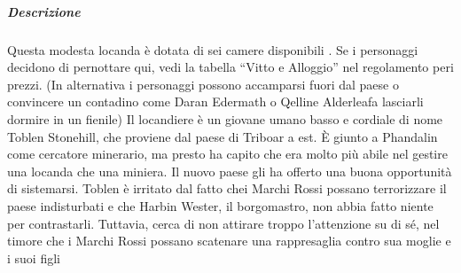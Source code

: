 \documentclass{article}
\begin{document}
\subparagraph{Descrizione}
Questa modesta locanda è dotata di sei camere disponibili
. Se i personaggi decidono
di pernottare qui, vedi la tabella “Vitto e Alloggio” nel
regolamento peri prezzi. (In alternativa i personaggi possono
accamparsi fuori dal paese o convincere un contadino come
Daran Edermath o Qelline Alderleafa lasciarli dormire
in un fienile)
Il locandiere è un giovane umano basso e cordiale di nome
Toblen Stonehill, che proviene dal paese di Triboar a est.
È giunto a Phandalin come cercatore minerario, ma presto
ha capito che era molto più abile nel gestire una locanda
che una miniera. Il nuovo paese gli ha offerto una buona
opportunità di sistemarsi. Toblen è irritato dal fatto chei
Marchi Rossi possano terrorizzare il paese indisturbati e
che Harbin Wester, il borgomastro, non abbia fatto niente per
contrastarli. Tuttavia, cerca di non attirare troppo l’attenzione
su di sé, nel timore che i Marchi Rossi possano scatenare una
rappresaglia contro sua moglie e i suoi figli
\end{document}
